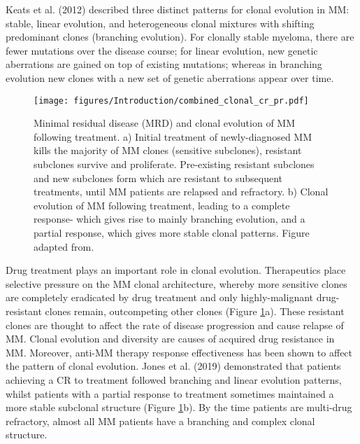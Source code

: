 Keats et al. (2012) described three distinct patterns for clonal evolution in MM: stable, linear evolution, and heterogeneous clonal mixtures with shifting predominant clones (branching evolution)\cite{keats2012clonal}.
For clonally stable myeloma, there are fewer mutations over the disease course;
for linear evolution, new genetic aberrations are gained on top of existing mutations;
whereas in branching evolution new clones with a new set of genetic aberrations appear over time.
%
\begin{figure}[htb]
\centering
\texttt{[image: figures/Introduction/combined\_clonal\_cr\_pr.pdf]}
\caption[Clonal evolution of MM with treatment]{Minimal residual disease (MRD) and clonal evolution of MM following treatment.
a) Initial treatment of newly-diagnosed MM kills the majority of MM clones (sensitive subclones), resistant subclones survive and proliferate.
Pre-existing resistant subclones and new subclones form which are resistant to subsequent treatments, until MM patients are relapsed and refractory.
b) Clonal evolution of MM following treatment, leading to a complete response- which gives rise to mainly branching evolution, and a partial response, which gives more stable clonal patterns.
Figure adapted from\cite{jones2019clonal}.
}
\label{fig:mrd_clones}
\end{figure}

Drug treatment plays an important role in clonal evolution.
Therapeutics place selective pressure on the MM clonal architecture, whereby more sensitive clones are completely eradicated by drug treatment and only highly-malignant drug-resistant clones remain, outcompeting other clones\cite{furukawa2020molecular} (Figure \ref{fig:mrd_clones}a).
These resistant clones are thought to affect the rate of disease progression and cause relapse of MM\@.
Clonal evolution and diversity are causes of acquired drug resistance in MM\@.
Moreover, anti-MM therapy response effectiveness has been shown to affect the pattern of clonal evolution.
Jones et al. (2019) demonstrated that patients achieving a CR to treatment followed branching and linear evolution patterns, whilst patients with a partial response to treatment sometimes maintained a more stable subclonal structure\cite{jones2019clonal} (Figure \ref{fig:mrd_clones}b).
By the time patients are multi-drug refractory, almost all MM patients have a branching and complex clonal structure\cite{maura2019genomic}.

